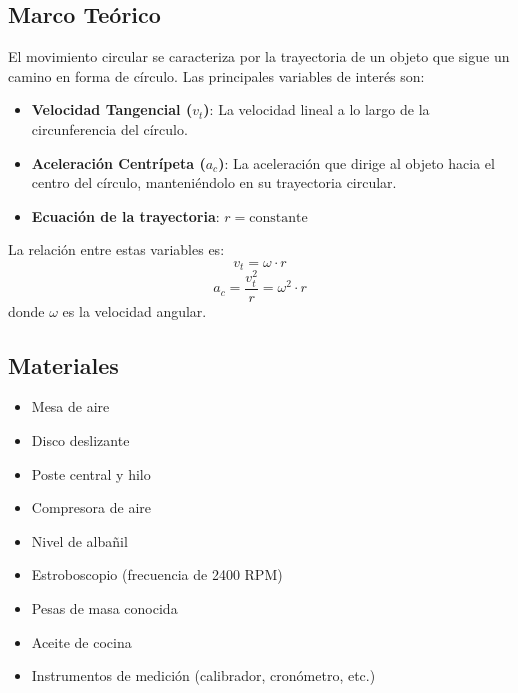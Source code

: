 \documentclass{article}
\begin{document}
\subsection{Marco Teórico}
El movimiento circular se caracteriza por la trayectoria de un objeto que sigue un camino en forma de círculo. Las principales variables de interés son:
\begin{itemize}
    \item \textbf{Velocidad Tangencial (\(v_t\))}: La velocidad lineal a lo largo de la circunferencia del círculo.
    \item \textbf{Aceleración Centrípeta (\(a_c\))}: La aceleración que dirige al objeto hacia el centro del círculo, manteniéndolo en su trayectoria circular.
    \item \textbf{Ecuación de la trayectoria}: \( r = \text{constante} \)
\end{itemize}

La relación entre estas variables es:
\[ v_t = \omega \cdot r \]
\[ a_c = \frac{v_t^2}{r} = \omega^2 \cdot r \]
donde \(\omega\) es la velocidad angular.

\subsection{Materiales}
\begin{itemize}
    \item Mesa de aire
    \item Disco deslizante
    \item Poste central y hilo
    \item Compresora de aire
    \item Nivel de albañil
    \item Estroboscopio (frecuencia de 2400 RPM)
    \item Pesas de masa conocida
    \item Aceite de cocina
    \item Instrumentos de medición (calibrador, cronómetro, etc.)
\end{itemize}
\end{document}
